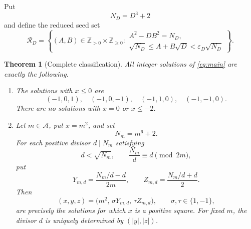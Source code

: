 \documentclass[a4paper,11pt]{amsart}
\numberwithin{equation}{section}
\newtheorem{theorem}{Theorem}[section]
\theoremstyle{definition}
\theoremstyle{remark}
\newcommand{\Z}{\mathbb Z}
\newcommand{\eps}{\varepsilon}
\newcommand{\Acal}{\mathcal A}
\newcommand{\Rcal}{\mathcal R}
\begin{document}
Put
\begin{equation}\label{eq:ND}
 N_D=D^3+2
\end{equation}
and define the reduced seed set
\begin{equation}\label{eq:seed-set}
 \Rcal_D=
 \left\{
 (A,B)\in\Z_{>0}\times\Z_{\geq0}:
 \begin{array}{l}
 A^2-DB^2=N_D,\\[2mm]
 \sqrt{N_D}\leq A+B\sqrt D<\eps_D\sqrt{N_D}
 \end{array}
 \right\}.
\end{equation}

\begin{theorem}[Complete classification]\label{thm:main}
All integer solutions of \eqref{eq:main} are exactly the following.

\begin{enumerate}[label=\textup{(\roman*)},leftmargin=2.2em]
\item The solutions with \(x\leq0\) are
\begin{equation}\label{eq:negative-solutions}
 (-1,0,1),\quad (-1,0,-1),\quad
 (-1,1,0),\quad (-1,-1,0).
\end{equation}
There are no solutions with \(x=0\) or \(x\leq-2\).

\item Let \(m\in\Acal\), put \(x=m^2\), and set
\begin{equation}\label{eq:Nm}
 N_m=m^6+2.
\end{equation}
For each positive divisor \(d\mid N_m\) satisfying
\begin{equation}\label{eq:divisor-condition}
 d<\sqrt{N_m},
 \qquad
 \frac{N_m}{d}\equiv d\pmod{2m},
\end{equation}
put
\begin{equation}\label{eq:square-formulas}
 Y_{m,d}=\frac{N_m/d-d}{2m},
 \qquad
 Z_{m,d}=\frac{N_m/d+d}{2}.
\end{equation}
Then
\begin{equation}\label{eq:square-solutions}
 (x,y,z)=\bigl(m^2,\,\sigma Y_{m,d},\,\tau Z_{m,d}\bigr),
 \qquad \sigma,\tau\in\{1,-1\},
\end{equation}
are precisely the solutions for which \(x\) is a positive square.  For fixed
\(m\), the divisor \(d\) is uniquely determined by \((|y|,|z|)\).


\end{enumerate}
\end{theorem}
\end{document}

